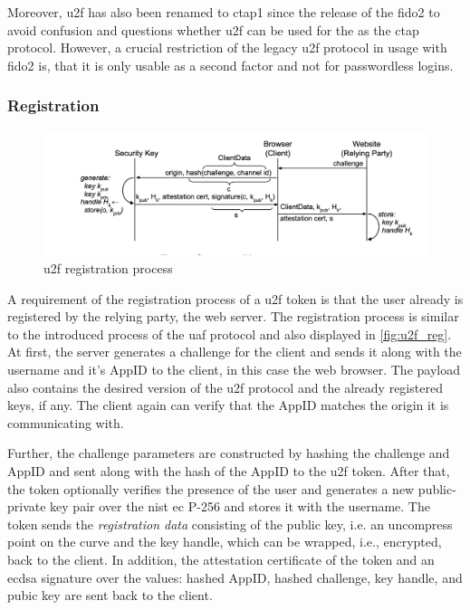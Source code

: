 Moreover, \gls{u2f} has also been renamed to \gls{ctap}1 since the release of the \gls{fido}2 to avoid confusion and questions whether \gls{u2f} can be used for the \wa{} as the \gls{ctap} protocol. However, a crucial restriction of the legacy \gls{u2f} protocol in usage with \gls{fido}2 is, that it is only usable as a second factor and not for passwordless logins.

\subsubsection{Registration}

\begin{figure}[hbt]
	\centering
	\includegraphics[width=\textwidth]{pics/u2f_reg}
	\caption[\gls{u2f} registration process]{\gls{u2f} registration process\footnotemark}
	\label{fig:u2f_reg}
\end{figure}

A requirement of the registration process of a \gls{u2f} token is that the user already is registered by the relying party, the web server. The registration process is similar to the introduced process of the \gls{uaf} protocol and also displayed in \autoref{fig:u2f_reg}. At first, the server generates a challenge for the client and sends it along with the username and it's AppID to the client, in this case the web browser. The payload also contains the desired version of the \gls{u2f} protocol and the already registered keys, if any. The client again can verify that the AppID matches the origin it is communicating with.

Further, the challenge parameters are constructed by hashing the challenge and AppID and sent along with the hash of the AppID to the \gls{u2f} token. After that, the token optionally verifies the presence of the user and generates a new public-private key pair over the \gls{nist} \gls{ec} P-256 and stores it with the username. The token sends the \textit{registration data} consisting of the public key, i.e. an uncompress point on the curve and the key handle, which can be wrapped, i.e., encrypted, back to the client. In addition, the attestation certificate of the token and an \gls{ecdsa} signature over the values: hashed AppID, hashed challenge, key handle, and pubic key are sent back to the client.

